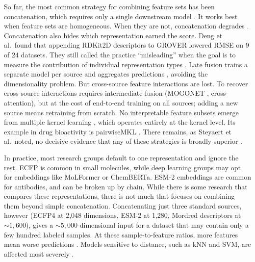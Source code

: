 So far, the most common strategy for combining feature sets has been concatenation, which requires only a single downstream model \citep{Stahlschmidt2022}. It works best when feature sets are homogeneous. When they are not, concatenation degrades \citep{Stahlschmidt2022}. Concatenation also hides which representation earned the score. Deng et al.\ found that appending RDKit2D descriptors to GROVER lowered RMSE on 9 of 24 datasets. They still called the practice ``misleading'' when the goal is to measure the contribution of individual representation types \citep{Deng2023}. Late fusion trains a separate model per source and aggregates predictions \citep{Steyaert2023}, avoiding the dimensionality problem. But cross-source feature interactions are lost. To recover cross-source interactions requires intermediate fusion (MOGONET \citep{Wang2021}, cross-attention), but at the cost of end-to-end training on all sources; adding a new source means retraining from scratch. No interpretable feature subsets emerge from multiple kernel learning \citep{Gonen2011}, which operates entirely at the kernel level. Its example in drug bioactivity is pairwiseMKL \citep{Cichonska2018}. There remains, as Steyaert et al.\ noted, no decisive evidence that any of these strategies is broadly superior \citep{Steyaert2023}.

In practice, most research groups default to one representation and ignore the rest. ECFP is common in small molecules, while deep learning groups may opt for embeddings like MoLFormer or ChemBERTa. ESM-2 embeddings are common for antibodies, and can be broken up by chain. While there is some research that compares these representations, there is not much that focuses on combining them beyond simple concatenation. Concatenating just three standard sources, however (ECFP4 at 2,048 dimensions, ESM-2 at 1,280, Mordred descriptors at ${\sim}1{,}600$), gives a ${\sim}5{,}000$-dimensional input for a dataset that may contain only a few hundred labeled samples. At these sample-to-feature ratios, more features mean worse predictions \citep{Hughes1968, Bellman1961}. Models sensitive to distance, such as kNN and SVM, are affected most severely \citep{FernandezDelgado2014}.

